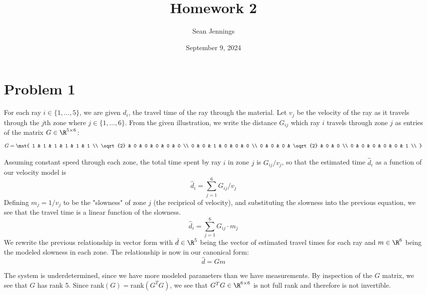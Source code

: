 \documentclass{homework}
\title{Homework 2}
\author{Sean Jennings}
\date{September 9, 2024}
\begin{document}
\maketitle

\section{Problem 1}
\begin{letterenum}
\item 
For each ray $i\in\{1, \dots, 5\}$, we are given $d_i$, the travel time of the ray through the material. 
Let $v_j$ be the velocity of the ray as it travels through the $j$th zone where $j\in\{1,\dots,6\}$. From
the given illustration, we write the distance $G_{ij}$ which ray $i$ travels through zone $j$ as
entries of the matrix $G\in\R^{5\times 6}$:
\begin{equation*}
    G = \mat{
        1 & 1 & 1 & 1 & 1 & 1 \\
        \sqrt{2} & 0 & 0 & 0 & 0 & 0 \\
        0 & 0 & 1 & 0 & 0 & 0 \\
        0 & 0 & 0 & \sqrt{2} & 0 & 0 \\
        0 & 0 & 0 & 0 & 0 & 1 \\
    }
\end{equation*}

Assuming constant speed through each zone, the total time spent by ray $i$ in zone $j$ is $G_{ij} / v_j$,
so that the estimated time $\hat{d}_i$ as a function of our velocity model is
\begin{equation*}
    \hat{d}_i = \sum_{j=1}^{6} G_{ij} / v_j
\end{equation*}
Defining $m_j = 1 / v_j$ to be the "slowness" of zone $j$ (the recipricol of velocity), and substituting the slowness into the previous
equation, we see that the travel time is a linear function of the slowness.
\begin{equation*}
    \hat{d}_i = \sum_{j=1}^{6} G_{ij} \cdot m_j
\end{equation*}
We rewrite the previous relationship in vector form with $\hat{d}\in\R^5$ being the vector of estimated travel times for each
ray and $m\in\R^6$ being the modeled slowness in each zone. The relationship is now in our canonical form:
\begin{equation}
    \hat{d} = Gm
    \label{eq:canonical-linear}
\end{equation}

\item The system is underdetermined, since we have more modeled parameters than we have measurements. By inspection of the
$G$ matrix, we see that $G$ has rank 5. Since rank$(G)=$rank$(G^T G)$, we see that $G^T G \in\R^{6 \times 6}$ is not full
rank and therefore is not invertible.


\end{letterenum}
\end{document}
